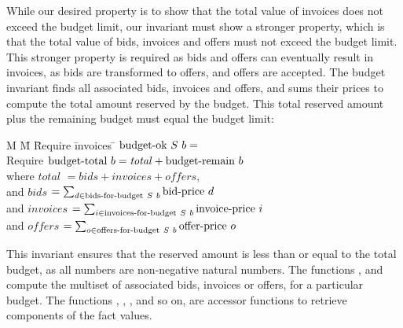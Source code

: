 While our desired property is to show that the total value of invoices does not exceed the budget limit, our invariant must show a stronger property, which is that the total value of bids, invoices and offers must not exceed the budget limit.
This stronger property is required as bids and offers can eventually result in invoices, as bids are transformed to offers, and offers are accepted.
The budget invariant finds all associated bids, invoices and offers, and sums their prices to compute the total amount reserved by the budget.
This total reserved amount plus the remaining budget must equal the budget limit:

\begin{tabbing}
M \= M \= Require \= invoices \= \kill
\> $\textrm{budget-ok}~{S}~b = $ \\
\> \> Require \> $\textrm{budget-total}~b = \mathit{total} + \textrm{budget-remain}~b$ \\
\> \> where \> $\mathit{total}$ \> $= \mathit{bids} + \mathit{invoices} + \mathit{offers}$, \\
\> \> and \> $\mathit{bids}$ \> $= \sum_{d \in \textrm{bids-for-budget}~S~b} \textrm{bid-price}~d$ \\
\> \> and \> $\mathit{invoices}$ \> $= \sum_{i \in \textrm{invoices-for-budget}~S~b} \textrm{invoice-price}~i$ \\
\> \> and \> $\mathit{offers}$ \> $= \sum_{o \in \textrm{offers-for-budget}~S~b} \textrm{offer-price}~o$ \\
\end{tabbing}

This invariant ensures that the reserved amount is less than or equal to the total budget, as all numbers are non-negative natural numbers.
The functions ,  and  compute the multiset of associated bids, invoices or offers, for a particular budget.
The functions , , , and so on, are accessor functions to retrieve components of the fact values.
